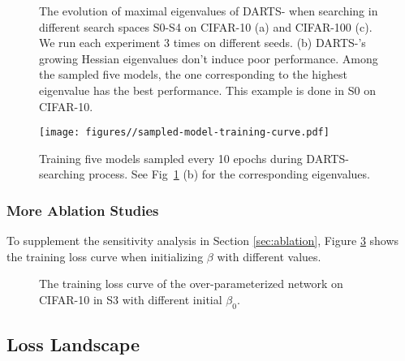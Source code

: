 \documentclass{article} \usepackage{iclr2021_conference,times}
\begin{document}
\begin{figure}[ht]
	\centering
	\caption{The evolution of maximal eigenvalues of DARTS- when searching in different search spaces S0-S4 on CIFAR-10 (a) and CIFAR-100 (c). We run each experiment 3 times on different seeds. (b) DARTS-'s growing Hessian eigenvalues don't induce poor performance. Among the sampled five models, the one corresponding to the highest eigenvalue has the best performance. This example is done in S0 on CIFAR-10.}
	\label{fig:eigen_value}
\end{figure}

\begin{figure}[ht]
\centering
\texttt{[image: figures//sampled-model-training-curve.pdf]}
\caption{Training five models sampled every 10 epochs during DARTS- searching process. See Fig~\ref{fig:eigen_value} (b) for the corresponding eigenvalues.}
\label{fig:sample-model-training-curve}
\end{figure}



\subsubsection{More Ablation Studies}\label{app:ablation} 


To supplement the sensitivity analysis in Section \ref{sec:ablation}, Figure \ref{fig:beta-loss} shows the training loss curve when initializing $\beta$ with different values.
\begin{figure}[ht]
\centering
{}
\caption{The training loss curve of the over-parameterized network on CIFAR-10 in S3 with different initial $\beta_0$.}
\label{fig:beta-loss}
\end{figure}






 

\subsection{Loss Landscape}
\end{document}
